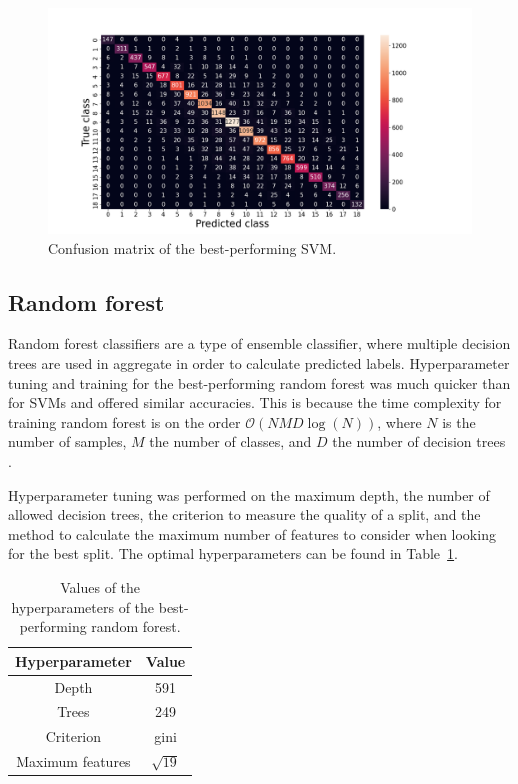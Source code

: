 \documentclass[11pt,a4paper]{article}
\begin{document}
\begin{figure}[h]
    \centering
    \includegraphics[width=\columnwidth, keepaspectratio]{../confusion_SVM.png}
    \caption{Confusion matrix of the best-performing SVM.}\label{fig:svm_confusion}
\end{figure}

\clearpage
\subsection{Random forest}
Random forest classifiers are a type of ensemble classifier, where multiple decision trees are used in aggregate in order to calculate predicted labels. Hyperparameter tuning and training for the best-performing random forest was much quicker than for SVMs and offered similar accuracies. This is because the time complexity for training random forest is on the order $\mathcal{O}(N M D \log({N}) )$, where $N$ is the number of samples, $M$ the number of classes, and $D$ the number of decision trees \citep{Zheng2021}.

Hyperparameter tuning was performed on the maximum depth, the number of allowed decision trees, the criterion to measure the quality of a split, and the method to calculate the maximum number of features to consider when looking for the best split. The optimal hyperparameters can be found in Table~\ref{tab:rf_hyperparameter}.

\begin{table}[ht]
    \centering
    \begin{tabular}{c|c}
        Hyperparameter & Value\\
        \hline
        Depth & 591 \\
        Trees & 249 \\
        Criterion & gini \\
        Maximum features & $\sqrt{19}$\\
    \end{tabular}
    \caption{Values of the hyperparameters of the best-performing random forest.}\label{tab:rf_hyperparameter}
\end{table}
\end{document}
